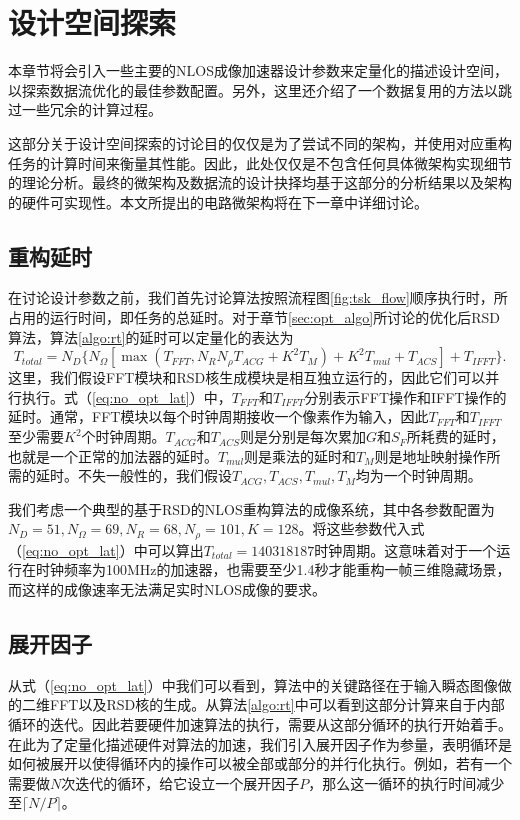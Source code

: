 \documentclass[master]{shtthesis}             %
\begin{document}
\section{设计空间探索}\label{sec:dse}

本章节将会引入一些主要的NLOS成像加速器设计参数来定量化的描述设计空间，以探索数据流优化的最佳参数配置。另外，这里还介绍了一个数据复用的方法以跳过一些冗余的计算过程。

这部分关于设计空间探索的讨论目的仅仅是为了尝试不同的架构，并使用对应重构任务的计算时间来衡量其性能。因此，此处仅仅是不包含任何具体微架构实现细节的理论分析。最终的微架构及数据流的设计抉择均基于这部分的分析结果以及架构的硬件可实现性。本文所提出的电路微架构将在下一章中详细讨论。

\subsection{重构延时}

在讨论设计参数之前，我们首先讨论算法按照流程图\ref{fig:tsk_flow}顺序执行时，所占用的运行时间，即任务的总延时。对于章节\ref{sec:opt_algo}所讨论的优化后RSD算法，算法\ref{algo:rt}的延时可以定量化的表达为
\begin{equation} \label{eq:no_opt_lat}
    T_{total} = N_D \{ N_{\Omega}[ \max (T_{FFT}, N_RN_{\rho}T_{ACG}+K^2T_M)+ K^2T_{mul}+T_{ACS} ] + T_{IFFT}\}.
\end{equation}
这里，我们假设FFT模块和RSD核生成模块是相互独立运行的，因此它们可以并行执行。式（\ref{eq:no_opt_lat}）中，$T_{FFT}$和$T_{IFFT}$分别表示FFT操作和IFFT操作的延时。通常，FFT模块以每个时钟周期接收一个像素作为输入，因此$T_{FFT}$和$T_{IFFT}$至少需要$K^2$个时钟周期。$T_{ACG}$和$T_{ACS}$则是分别是每次累加$G$和$S_F$所耗费的延时，也就是一个正常的加法器的延时。$T_{mul}$则是乘法的延时和$T_M$则是地址映射操作所需的延时。不失一般性的，我们假设$T_{ACG},T_{ACS},T_{mul},T_M$均为一个时钟周期。

我们考虑一个典型的基于RSD的NLOS重构算法的成像系统\citep{Liu2020}，其中各参数配置为$N_D=51, N_\Omega=69, N_R=68, N_\rho=101, K=128$。将这些参数代入式（\ref{eq:no_opt_lat}）中可以算出$T_{total}=140318187$时钟周期。这意味着对于一个运行在时钟频率为100MHz的加速器，也需要至少1.4秒才能重构一帧三维隐藏场景，而这样的成像速率无法满足实时NLOS成像的要求。

\subsection{展开因子}

从式（\ref{eq:no_opt_lat}）中我们可以看到，算法中的关键路径在于输入瞬态图像做的二维FFT以及RSD核的生成。从算法\ref{algo:rt}中可以看到这部分计算来自于内部循环的迭代。因此若要硬件加速算法的执行，需要从这部分循环的执行开始着手。在此为了定量化描述硬件对算法的加速，我们引入展开因子作为参量，表明循环是如何被展开以使得循环内的操作可以被全部或部分的并行化执行。例如，若有一个需要做$N$次迭代的循环，给它设立一个展开因子$P$，那么这一循环的执行时间减少至$\lceil N/P \rceil$。
\end{document}
